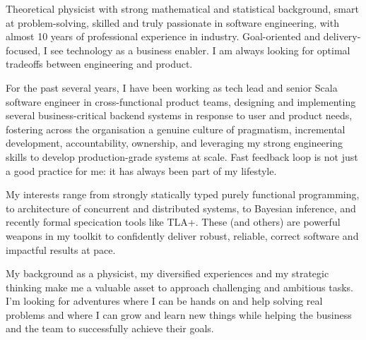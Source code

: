 
\begin{cvparagraph}
Theoretical physicist with strong mathematical and statistical 
background, smart at problem-solving, skilled and truly passionate in software engineering, with almost 10 years of professional experience in industry. Goal-oriented and delivery-focused, I see technology as a business enabler. I am always looking for optimal tradeoffs between engineering and product.

  For the past several years, I have been working as tech lead and senior Scala software engineer in cross-functional product teams, designing and implementing several business-critical backend systems in response to user and product needs, fostering  across the organisation a genuine culture of pragmatism, incremental development, accountability, ownership, and leveraging my strong engineering skills 
  to develop production-grade systems at scale. Fast feedback loop is not just a good practice for me: it has always been part of my lifestyle.

  My interests range from strongly statically typed purely functional programming, to architecture of concurrent and distributed systems, to Bayesian inference, and recently formal specication tools like TLA+. These (and others) are powerful weapons in my toolkit to confidently deliver robust, reliable, correct software and impactful results at pace. 

My background as a physicist, my diversified experiences and my strategic thinking make me a valuable asset to approach challenging and ambitious tasks. I'm looking for adventures where I can be hands on and help solving real problems and where I can grow and learn new things while helping the business and the team to successfully achieve their goals. 
\end{cvparagraph}
